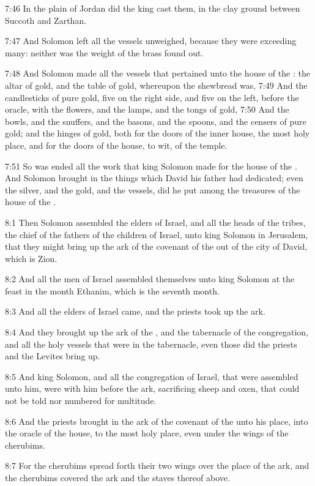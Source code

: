 7:46 In the plain of Jordan did the king cast them, in the clay ground between Succoth and Zarthan.

7:47 And Solomon left all the vessels unweighed, because they were exceeding many: neither was the weight of the brass found out.

7:48 And Solomon made all the vessels that pertained unto the house of the \LORD: the altar of gold, and the table of gold, whereupon the shewbread was, 7:49 And the candlesticks of pure gold, five on the right side, and five on the left, before the oracle, with the flowers, and the lamps, and the tongs of gold, 7:50 And the bowls, and the snuffers, and the basons, and the spoons, and the censers of pure gold; and the hinges of gold, both for the doors of the inner house, the most holy place, and for the doors of the house, to wit, of the temple.

7:51 So was ended all the work that king Solomon made for the house of the \LORD. And Solomon brought in the things which David his father had dedicated; even the silver, and the gold, and the vessels, did he put among the treasures of the house of the \LORD.

8:1 Then Solomon assembled the elders of Israel, and all the heads of the tribes, the chief of the fathers of the children of Israel, unto king Solomon in Jerusalem, that they might bring up the ark of the covenant of the \LORD out of the city of David, which is Zion.

8:2 And all the men of Israel assembled themselves unto king Solomon at the feast in the month Ethanim, which is the seventh month.

8:3 And all the elders of Israel came, and the priests took up the ark.

8:4 And they brought up the ark of the \LORD, and the tabernacle of the congregation, and all the holy vessels that were in the tabernacle, even those did the priests and the Levites bring up.

8:5 And king Solomon, and all the congregation of Israel, that were assembled unto him, were with him before the ark, sacrificing sheep and oxen, that could not be told nor numbered for multitude.

8:6 And the priests brought in the ark of the covenant of the \LORD unto his place, into the oracle of the house, to the most holy place, even under the wings of the cherubims.

8:7 For the cherubims spread forth their two wings over the place of the ark, and the cherubims covered the ark and the staves thereof above.

